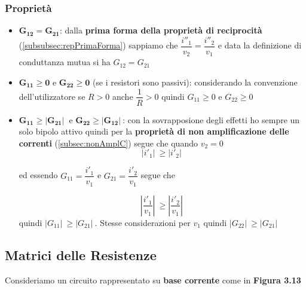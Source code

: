 \documentclass[a4paper]{report}
\begin{document}
\subsubsection{Propriet\`a}
\begin{itemize}
\item $\mathbf{G_{12}=G_{21}}$: dalla {\bf prima forma della propriet\`a
  di reciprocit\`a} (\ref{subsubsec:repPrimaForma}) sappiamo che
  $\dfrac{i''_1}{v_2}=\dfrac{i''_2}{v_1}$ e data la definizione di
  conduttanza mutua si ha $G_{12}=G_{21}$
\item $\mathbf{G_{11} \geq 0}$ e $\mathbf{G_{22} \geq 0}$ (se i
  resistori sono passivi): considerando la convenzione dell'utilizzatore se
  $R>0$ anche $\dfrac{1}{R}>0$ quindi $G_{11} \geq 0$ e $G_{22} \geq 0$
\item $\mathbf{G_{11} \geq |G_{21}|\ }$ e $\mathbf{G_{22} \geq
  |G_{12}|\ }$: con la sovrapposione degli effetti ho sempre un solo
  bipolo attivo quindi per la {\bf propriet\`a di non amplificazione
    delle correnti} (\ref{subsec:nonAmplC}) segue che quando $v_2=0$
  \[
  |i'_1|\ \geq |i'_2|\
  \]

  ed essendo $G_{11}=\dfrac{i'_1}{v_1}$ e $G_{21}=\dfrac{i'_2}{v_1}$
  segue che

  \[
  \left|\dfrac{i'_1}{v_1}\right|\ \geq \left|\dfrac{i'_2}{v_1}\right|\
  \]
  quindi $|G_{11}|\ \geq |G_{21}|\ $.
  Stesse considerazioni per $v_1$ quindi $|G_{22}|\ \geq |G_{21}|\ $
\end{itemize}

\subsection{Matrici delle Resistenze}
Consideriamo un circuito rappresentato su {\bf base corrente} come in
{\bf Figura 3.13}
\end{document}
